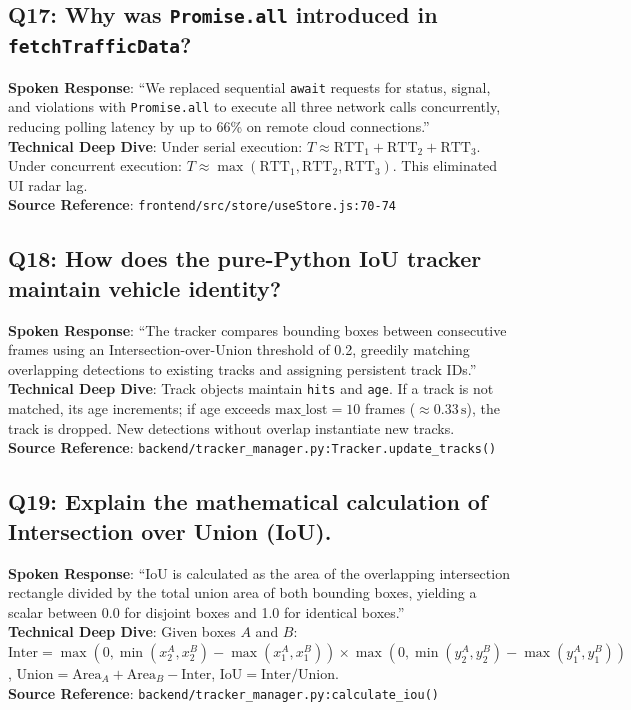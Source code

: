 \subsection*{Q17: Why was \texttt{Promise.all} introduced in \texttt{fetchTrafficData}?}
\begin{interviewbox}
\textbf{Spoken Response}: ``We replaced sequential \texttt{await} requests for status, signal, and violations with \texttt{Promise.all} to execute all three network calls concurrently, reducing polling latency by up to 66\% on remote cloud connections.''\\
\textbf{Technical Deep Dive}: Under serial execution: $T \approx \text{RTT}_1 + \text{RTT}_2 + \text{RTT}_3$. Under concurrent execution: $T \approx \max(\text{RTT}_1, \text{RTT}_2, \text{RTT}_3)$. This eliminated UI radar lag.\\
\textbf{Source Reference}: \texttt{frontend/src/store/useStore.js:70-74}
\end{interviewbox}

\subsection*{Q18: How does the pure-Python IoU tracker maintain vehicle identity?}
\begin{interviewbox}
\textbf{Spoken Response}: ``The tracker compares bounding boxes between consecutive frames using an Intersection-over-Union threshold of 0.2, greedily matching overlapping detections to existing tracks and assigning persistent track IDs.''\\
\textbf{Technical Deep Dive}: Track objects maintain \texttt{hits} and \texttt{age}. If a track is not matched, its age increments; if age exceeds $\text{max\_lost} = 10$ frames ($\approx 0.33\,\text{s}$), the track is dropped. New detections without overlap instantiate new tracks.\\
\textbf{Source Reference}: \texttt{backend/tracker\_manager.py:Tracker.update\_tracks()}
\end{interviewbox}

\subsection*{Q19: Explain the mathematical calculation of Intersection over Union (IoU).}
\begin{interviewbox}
\textbf{Spoken Response}: ``IoU is calculated as the area of the overlapping intersection rectangle divided by the total union area of both bounding boxes, yielding a scalar between 0.0 for disjoint boxes and 1.0 for identical boxes.''\\
\textbf{Technical Deep Dive}: Given boxes $A$ and $B$: $\text{Inter} = \max(0, \min(x_2^A, x_2^B) - \max(x_1^A, x_1^B)) \times \max(0, \min(y_2^A, y_2^B) - \max(y_1^A, y_1^B))$, $\text{Union} = \text{Area}_A + \text{Area}_B - \text{Inter}$, $\text{IoU} = \text{Inter} / \text{Union}$.\\
\textbf{Source Reference}: \texttt{backend/tracker\_manager.py:calculate\_iou()}
\end{interviewbox}

